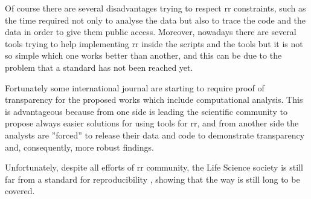 Of course there are several disadvantages trying to respect \gls{rr} constraints, such as the time required not only to analyse the data but also to trace the code and the data in order to give them public access. 
Moreover, nowadays there are several tools  \cite{Aranguren2015, Goecks2010a, Gentleman2004, Shepherd2018}  trying to help implementing \gls{rr} inside the scripts and the tools but it is not so simple which one works better than another, and this can be due to the problem that a standard has not been reached yet.

Fortunately some international journal are starting to require proof of transparency for the proposed works which include computational analysis.
This is advantageous because from one side is leading the scientific community to propose always easier solutions for using tools for \gls{rr}, and from another side the analysts are ''forced'' to release their data and code to demonstrate transparency and, consequently, more robust findings.

Unfortunately, despite all efforts of \gls{rr} community, the Life Science society is still far from a standard for reproducibility \cite{Iqbal2016}, showing that the way is still long to be covered.


